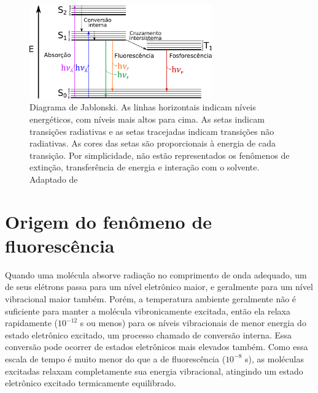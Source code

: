 		\begin{figure}[h]
			\centering
			\includegraphics[width=0.7\textwidth]{imagens/fluor/diagrama_jablonski}
			\caption{Diagrama de Jablonski. As linhas horizontais indicam níveis energéticos, com níveis mais altos para cima. As setas indicam transições radiativas e as setas tracejadas indicam transições não radiativas. As cores das setas são proporcionais à energia de cada transição. Por simplicidade, não estão representados os fenômenos de extinção, transferência de energia e interação com o solvente. Adaptado de \citeauthor{Lakowicz2006}}
			\label{fig:diagrama_jablonski} 
		\end{figure}  
		
		\section{Origem do fenômeno de fluorescência} 
		
		Quando uma molécula absorve radiação no comprimento de onda adequado, um de seus elétrons passa para um nível eletrônico maior, e geralmente para um nível vibracional maior também. Porém, a temperatura ambiente geralmente não é suficiente para manter a molécula vibronicamente excitada, então ela relaxa rapidamente (\(10^{-12}\) s ou menos) para os níveis vibracionais de menor energia do estado eletrônico excitado, um processo chamado de conversão interna. Essa conversão pode ocorrer de estados eletrônicos mais elevados também. Como essa escala de tempo é muito menor do que a de fluorescência (\(10^{-8}\) s), as moléculas excitadas relaxam completamente sua energia vibracional, atingindo um estado eletrônico excitado termicamente equilibrado.\cite{Lakowicz2006}
		
